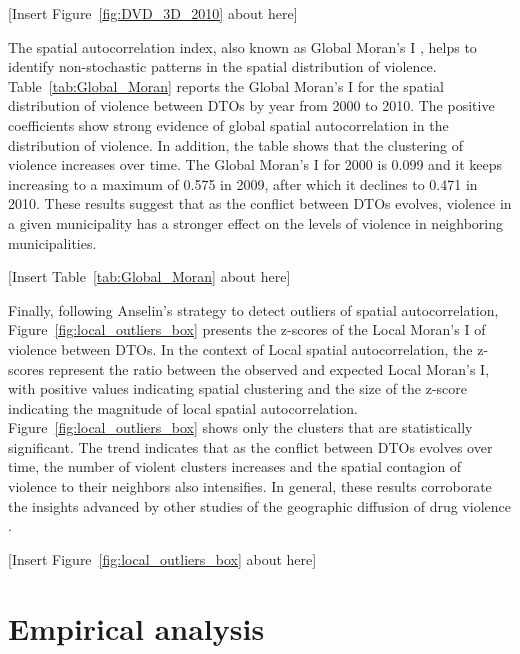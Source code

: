 \documentclass[12pt,letterpaper]{article}
\begin{document}
\begin{center}
   [Insert Figure~\ref{fig:DVD_3D_2010} about here]
\end{center}

The spatial autocorrelation index, also known as Global Moran's I \citep{Moran1950}, helps to identify non-stochastic patterns in the spatial distribution of violence. Table~\ref{tab:Global_Moran} reports the Global Moran's I for the spatial distribution of violence between DTOs by year from 2000 to 2010. The positive coefficients show strong evidence of global spatial autocorrelation in the distribution of violence. In addition, the table shows that the clustering of violence increases over time. The Global Moran's I for 2000 is 0.099 and it keeps increasing to a maximum of 0.575 in 2009, after which it declines to 0.471 in 2010. These results suggest that as the conflict between DTOs evolves, violence in a given municipality has a stronger effect on the levels of violence in neighboring municipalities.

\begin{center}
   [Insert Table~\ref{tab:Global_Moran} about here]
\end{center}

Finally, following Anselin's \citeyearpar{Anselin1995} strategy to detect outliers of spatial autocorrelation, Figure~\ref{fig:local_outliers_box} presents the z-scores of the Local Moran's I of violence between DTOs. In the context of Local spatial autocorrelation, the z-scores represent the ratio between the observed and expected Local Moran's I, with positive values indicating spatial clustering and the size of the z-score indicating the magnitude of local spatial autocorrelation. Figure~\ref{fig:local_outliers_box} shows only the clusters that are statistically significant. The trend indicates that as the conflict between DTOs evolves over time, the number of violent clusters increases and the spatial contagion of violence to their neighbors also intensifies. In general, these results corroborate the insights advanced by other studies of the geographic diffusion of drug violence \citep{Guerrero2011a,Rios2011,Shirk2010,Molzahn2013}. 

\begin{center}
   [Insert Figure~\ref{fig:local_outliers_box} about here]
\end{center}






\section*{Empirical analysis}
\end{document}

